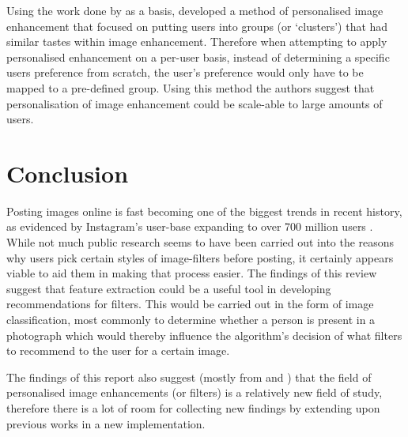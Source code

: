 \documentclass[a4paper,12pt]{article}
\begin{document}
    Using the work done by \cite{kang2010personalization} as a basis, \cite{caicedo2011collaborative} developed a method of personalised image enhancement that focused on putting users into groups (or ‘clusters’) that had similar tastes within image enhancement. Therefore when attempting to apply personalised enhancement on a per-user basis, instead of determining a specific users preference from scratch, the user's preference would only have to be mapped to a pre-defined group. Using this method the authors suggest that personalisation of image enhancement could be scale-able to large amounts of users.


\newpage
\section{Conclusion}
  Posting images online is fast becoming one of the biggest trends in recent history, as evidenced by Instagram's user-base expanding to over 700 million users \citep{instagram2017users}. While not much public research seems to have been carried out into the reasons why users pick certain styles of image-filters before posting, it certainly appears viable to aid them in making that process easier.
  The findings of this review suggest that feature extraction could be a useful tool in developing recommendations for filters. This would be carried out in the form of image classification, most commonly to determine whether a person is present in a photograph which would thereby influence the algorithm's decision of what filters to recommend to the user for a certain image.

  The findings of this report also suggest (mostly from \cite{kang2010personalization} and \cite{caicedo2011collaborative}) that the field of personalised image enhancements (or filters) is a relatively new field of study, therefore there is a lot of room for collecting new findings by extending upon previous works in a new implementation.

\newpage
\singlespacing



\end{document}
